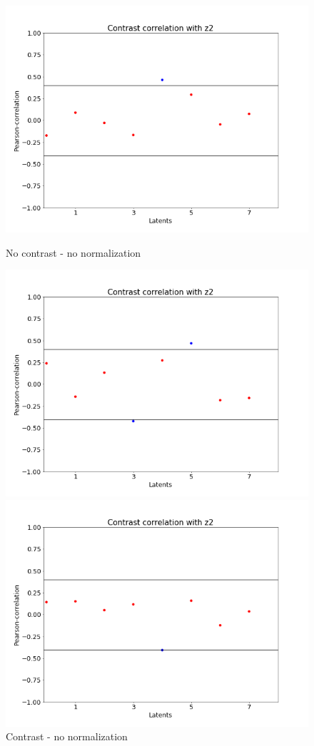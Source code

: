 \documentclass[12pt, english]{article}
\begin{document}
\begin{figure}[H] 
  \label{fig:contrast-correlation} 
  \begin{minipage}{0.5\linewidth}
    \centering
    \includegraphics[width=.72\linewidth]{contrast_to_latent/no_norm_contrast_z2_corr.png} 
    \caption{No contrast - no normalization} 
    \label{fig:no-contrast-no-norm}
  \end{minipage}%
  \begin{minipage}{0.5\linewidth}
    \centering
    \includegraphics[width=.72\linewidth]{contrast_to_latent/no_norm_contrast_contrast_z2_corr.png} 
    \caption{Contrast - no normalization} 
    \label{fig:contrast-no-norm}
  \end{minipage} 
  \begin{minipage}{0.5\linewidth}
    \centering
    \includegraphics[width=.72\linewidth]{contrast_to_latent/norm_no_contrast_correlation.png} 

\end{minipage}
\end{figure}
\end{document}
